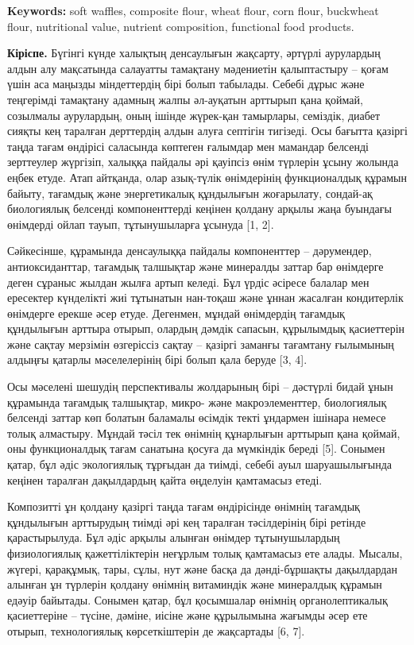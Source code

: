 {\bfseries Keywords:} soft waffles, composite flour, wheat flour, corn
flour, buckwheat flour, nutritional value, nutrient composition,
functional food products.

{\bfseries Кіріспе.} Бүгінгі күнде халықтың денсаулығын жақсарту, әртүрлі
аурулардың алдын алу мақсатында салауатты тамақтану мәдениетін
қалыптастыру -- қоғам үшін аса маңызды міндеттердің бірі болып табылады.
Себебі дұрыс және теңгерімді тамақтану адамның жалпы әл-ауқатын арттырып
қана қоймай, созылмалы аурулардың, оның ішінде жүрек-қан тамырлары,
семіздік, диабет сияқты кең таралған дерттердің алдын алуға септігін
тигізеді. Осы бағытта қазіргі таңда тағам өндірісі саласында көптеген
ғалымдар мен мамандар белсенді зерттеулер жүргізіп, халыққа пайдалы әрі
қауіпсіз өнім түрлерін ұсыну жолында еңбек етуде. Атап айтқанда, олар
азық-түлік өнімдерінің функционалдық құрамын байыту, тағамдық және
энергетикалық құндылығын жоғарылату, сондай-ақ биологиялық белсенді
компоненттерді кеңінен қолдану арқылы жаңа буындағы өнімдерді ойлап
тауып, тұтынушыларға ұсынуда {[}1, 2{]}.

Сәйкесінше, құрамында денсаулыққа пайдалы компоненттер -- дәрумендер,
антиоксиданттар, тағамдық талшықтар және минералды заттар бар өнімдерге
деген сұраныс жылдан жылға артып келеді. Бұл үрдіс әсіресе балалар мен
ересектер күнделікті жиі тұтынатын нан-тоқаш және ұннан жасалған
кондитерлік өнімдерге ерекше әсер етуде. Дегенмен, мұндай өнімдердің
тағамдық құндылығын арттыра отырып, олардың дәмдік сапасын, құрылымдық
қасиеттерін және сақтау мерзімін өзгеріссіз сақтау -- қазіргі заманғы
тағамтану ғылымының алдыңғы қатарлы мәселелерінің бірі болып қала беруде
{[}3, 4{]}.

Осы мәселені шешудің перспективалы жолдарының бірі -- дәстүрлі бидай
ұнын құрамында тағамдық талшықтар, микро- және макроэлементтер,
биологиялық белсенді заттар көп болатын баламалы өсімдік текті ұндармен
ішінара немесе толық алмастыру. Мұндай тәсіл тек өнімнің құнарлығын
арттырып қана қоймай, оны функционалдық тағам санатына қосуға да
мүмкіндік береді {[}5{]}. Сонымен қатар, бұл әдіс экологиялық тұрғыдан
да тиімді, себебі ауыл шаруашылығында кеңінен таралған дақылдардың қайта
өңделуін қамтамасыз етеді.

Композитті ұн қолдану қазіргі таңда тағам өндірісінде өнімнің тағамдық
құндылығын арттырудың тиімді әрі кең таралған тәсілдерінің бірі ретінде
қарастырылуда. Бұл әдіс арқылы алынған өнімдер тұтынушылардың
физиологиялық қажеттіліктерін неғұрлым толық қамтамасыз ете алады.
Мысалы, жүгері, қарақұмық, тары, сұлы, нут және басқа да дәнді-бұршақты
дақылдардан алынған ұн түрлерін қолдану өнімнің витаминдік және
минералдық құрамын едәуір байытады. Сонымен қатар, бұл қосымшалар
өнімнің органолептикалық қасиеттеріне -- түсіне, дәміне, иісіне және
құрылымына жағымды әсер ете отырып, технологиялық көрсеткіштерін де
жақсартады {[}6, 7{]}.

